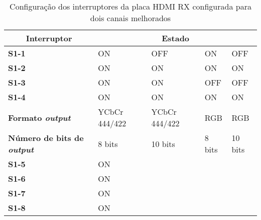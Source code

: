 \begin{table}[h!]
	\centering
		\caption{Configuração dos interruptores da placa HDMI RX configurada para dois canais melhorados}
	\label{table:HDMI_2ch_melhoradp_RX}
		\begin{tabular}{lllll}
			\hline
			\multicolumn{1}{c}{\textbf{Interruptor}}               & \multicolumn{4}{c}{\textbf{Estado}}              \\ \hline
			\multicolumn{1}{l|}{\textbf{S1-1}}                     & ON            & OFF           & ON     & OFF     \\
			\multicolumn{1}{l|}{\textbf{S1-2}}                     & ON            & ON            & ON     & ON      \\
			\multicolumn{1}{l|}{\textbf{S1-3}}                     & ON            & ON            & OFF    & OFF     \\
			\multicolumn{1}{l|}{\textbf{S1-4}}                     & ON            & ON            & ON     & ON      \\
			\multicolumn{1}{l|}{\textbf{Formato \textit{output}}}           & YCbCr 444/422 & YCbCr 444/422 & RGB    & RGB     \\
			\multicolumn{1}{l|}{\textbf{Número de bits de \textit{output}}} & 8 bits        & 10 bits       & 8 bits & 10 bits \\
			\multicolumn{1}{l|}{\textbf{S1-5}}                     & \multicolumn{4}{l}{ON}                           \\
			\multicolumn{1}{l|}{\textbf{S1-6}}                     & \multicolumn{4}{l}{ON}                           \\
			\multicolumn{1}{l|}{\textbf{S1-7}}                     & \multicolumn{4}{l}{ON}                           \\
			\multicolumn{1}{l|}{\textbf{S1-8}}                     & \multicolumn{4}{l}{ON}                           \\ \hline
		\end{tabular}%
\end{table}

